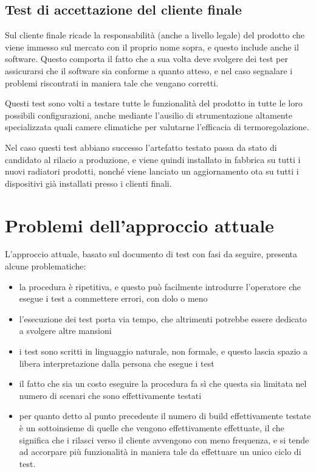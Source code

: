 \documentclass[12pt,a4paper,twoside,titlepage]{book}
\begin{document}
\subsection{Test di accettazione del cliente finale}

Sul cliente finale ricade la responsabilità (anche a livello legale) del prodotto
che viene immesso sul mercato con il proprio nome sopra, e questo include anche
il software. Questo comporta il fatto che a sua volta deve svolgere dei test per
assicurarsi che il software sia conforme a quanto atteso, e nel caso segnalare i
problemi riscontrati in maniera tale che vengano corretti.

Questi test sono volti a testare tutte le funzionalità del prodotto in tutte le loro
possibili configurazioni, anche mediante l'ausilio di strumentazione altamente
specializzata quali camere climatiche per valutarne l'efficacia di termoregolazione.

Nel caso questi test abbiano successo l'artefatto testato passa da stato di candidato
al rilacio a produzione, e viene quindi installato in fabbrica su tutti i nuovi radiatori
prodotti, nonché viene lanciato un aggiornamento \acrshort{ota} su tutti i dispositivi già installati
presso i clienti finali.

\section{Problemi dell'approccio attuale}

L'approccio attuale, basato sul documento di test con fasi da seguire, presenta
alcune problematiche:
\begin{itemize}
    \item la procedura è ripetitiva, e questo può facilmente introdurre
        l'operatore che esegue i test a commettere errori, con dolo o meno
    \item l'esecuzione dei test porta via tempo, che altrimenti potrebbe essere dedicato
        a svolgere altre mansioni
    \item i test sono scritti in linguaggio naturale, non formale, e questo lascia spazio
        a libera interpretazione dalla persona che esegue i test
    \item il fatto che sia un costo eseguire la procedura fa sì che questa sia
        limitata nel numero di scenari che sono effettivamente testati
    \item per quanto detto al punto precedente il numero di build effettivamente testate
        è un sottoinsieme di quelle che vengono effettivamente effettuate, il che significa che
        i rilasci verso il cliente avvengono con meno frequenza, e si tende ad accorpare
        più funzionalità in maniera tale da effettuare un unico ciclo di test.
\end{itemize}
\end{document}
